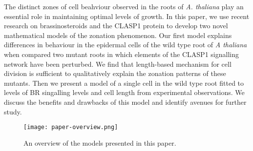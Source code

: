 The distinct zones of cell beahviour observed in the roots of \emph{A. thaliana} play an essential role in maintaining optimal levels of growth. In this paper, we use recent research on brassinosteroids and the CLASP1 protein to develop two novel mathematical models of the zonation phenomenon. Our first model explains differences in behaviour in the epidermal cells of the wild type root of \emph{A thaliana} when compared two mutant roots in which elements of the CLASP1 signalling network have been perturbed. We find that length-based mechanism for cell division is sufficient to qualitatively explain the zonation patterns of these mutants. Then we present a model of a single cell in the wild type root fitted to levels of BR singalling levels and cell length from experimental observations. We discuss the benefits and drawbacks of this model and identify avenues for further study.

\medskip

\begin{figure}[!htbp]
    \centering
    \texttt{[image: paper-overview.png]}
    \label{fig:paper-overview}
    \caption{An overview of the models presented in this paper.}
\end{figure}
